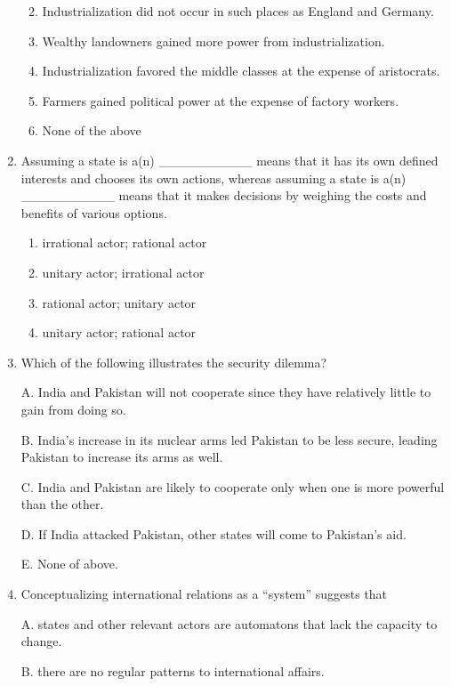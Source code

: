 \documentclass[
]{book}
\begin{document}
\begin{enumerate}
  \begin{enumerate}
  \def\labelenumii{\Alph{enumii}.}
  \item
    Industrialization did not occur in such places as England and Germany.
  \item
    Wealthy landowners gained more power from industrialization.
  \item
    Industrialization favored the middle classes at the expense of aristocrats.
  \item
    Farmers gained political power at the expense of factory workers.
  \item
    None of the above
  \end{enumerate}
\item
  Assuming a state is a(n) \_\_\_\_\_\_\_\_\_\_ means that it has its own defined interests and chooses its own actions, whereas assuming a state is a(n) \_\_\_\_\_\_\_\_\_\_ means that it makes decisions by weighing the costs and benefits of various options.

  \begin{enumerate}
  \def\labelenumii{\Alph{enumii}.}
  \item
    irrational actor; rational actor
  \item
    unitary actor; irrational actor
  \item
    rational actor; unitary actor
  \item
    unitary actor; rational actor
  \end{enumerate}
\item
  Which of the following illustrates the security dilemma?

  A. India and Pakistan will not cooperate since they have relatively little to gain from doing so.

  B. India's increase in its nuclear arms led Pakistan to be less secure, leading Pakistan to increase its arms as well.

  C. India and Pakistan are likely to cooperate only when one is more powerful than the other.

  D. If India attacked Pakistan, other states will come to Pakistan's aid.

  E. None of above.
\item
  Conceptualizing international relations as a ``system'' suggests that

  A. states and other relevant actors are automatons that lack the capacity to change.

  B. there are no regular patterns to international affairs.


\end{enumerate}
\end{document}
